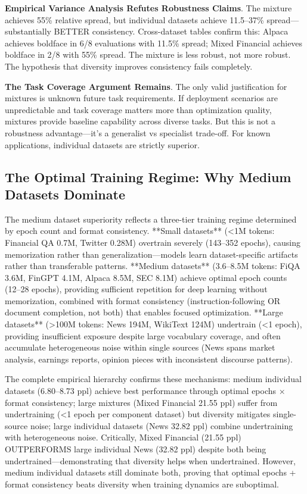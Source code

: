 \textbf{Empirical Variance Analysis Refutes Robustness Claims}. The mixture achieves 55\% relative spread, but individual datasets achieve 11.5–37\% spread—substantially BETTER consistency. Cross-dataset tables confirm this: Alpaca achieves boldface in 6/8 evaluations with 11.5\% spread; Mixed Financial achieves boldface in 2/8 with 55\% spread. The mixture is less robust, not more robust. The hypothesis that diversity improves consistency fails completely.

\textbf{The Task Coverage Argument Remains}. The only valid justification for mixtures is unknown future task requirements. If deployment scenarios are unpredictable and task coverage matters more than optimization quality, mixtures provide baseline capability across diverse tasks. But this is not a robustness advantage—it's a generalist vs specialist trade-off. For known applications, individual datasets are strictly superior.

\subsection{The Optimal Training Regime: Why Medium Datasets Dominate}

The medium dataset superiority reflects a three-tier training regime determined by epoch count and format consistency. **Small datasets** (<1M tokens: Financial QA 0.7M, Twitter 0.28M) overtrain severely (143–352 epochs), causing memorization rather than generalization—models learn dataset-specific artifacts rather than transferable patterns. **Medium datasets** (3.6–8.5M tokens: FiQA 3.6M, FinGPT 4.1M, Alpaca 8.5M, SEC 8.1M) achieve optimal epoch counts (12–28 epochs), providing sufficient repetition for deep learning without memorization, combined with format consistency (instruction-following OR document completion, not both) that enables focused optimization. **Large datasets** (>100M tokens: News 194M, WikiText 124M) undertrain (<1 epoch), providing insufficient exposure despite large vocabulary coverage, and often accumulate heterogeneous noise within single sources (News spans market analysis, earnings reports, opinion pieces with inconsistent discourse patterns).

The complete empirical hierarchy confirms these mechanisms: medium individual datasets (6.80–8.73 ppl) achieve best performance through optimal epochs × format consistency; large mixtures (Mixed Financial 21.55 ppl) suffer from undertraining (<1 epoch per component dataset) but diversity mitigates single-source noise; large individual datasets (News 32.82 ppl) combine undertraining with heterogeneous noise. Critically, Mixed Financial (21.55 ppl) OUTPERFORMS large individual News (32.82 ppl) despite both being undertrained—demonstrating that diversity helps when undertrained. However, medium individual datasets still dominate both, proving that optimal epochs + format consistency beats diversity when training dynamics are suboptimal.

